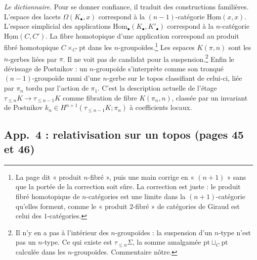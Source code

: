 \documentclass[11pt,a4paper]{article}
\begin{document}
\emph{Le dictionnaire.} Pour se donner confiance, il traduit des
constructions familières. L'espace des lacets $\Omega(K_\bullet,x)$
correspond à la $(n-1)$-catégorie $\underline{\mathrm{Hom}}(x,x)$. L'espace
simplicial des applications $\mathrm{Hom}_\bullet(K_\bullet,K'_\bullet)$
correspond à la $n$-catégorie $\underline{\mathrm{Hom}}(C,C')$. La fibre
homotopique d'une application correspond au produit fibré homotopique
$C \times_{C'} \mathrm{pt}$ dans les $n$-groupoïdes.\footnote{La page dit
« produit $n$-fibré », puis une main corrige en « $(n+1)$ » sans que la
portée de la correction soit sûre. La correction est juste : le produit
fibré homotopique de $n$-catégories est une limite dans la
$(n+1)$-catégorie qu'elles forment, comme le « produit $2$-fibré » de
catégories de Giraud est celui des $1$-catégories.} Les espaces
$K(\pi,n)$ sont les $n$-gerbes liées par $\pi$. Il ne voit pas de candidat
pour la suspension.\footnote{Il n'y en a pas à l'intérieur des
$n$-groupoïdes : la suspension d'un $n$-type n'est pas un $n$-type. Ce qui
existe est $\tau_{\leqslant n}\Sigma$, la somme amalgamée
$\mathrm{pt}\sqcup_C\mathrm{pt}$ calculée dans les $n$-groupoïdes.
Commentaire nôtre.} Enfin le dévissage de Postnikov : un $n$-groupoïde
s'interprète comme son tronqué $(n-1)$-groupoïde muni d'une $n$-gerbe sur
le topos classifiant de celui-ci, liée par $\pi_n$ tordu par l'action de
$\pi_1$. C'est la description actuelle de l'étage
$\tau_{\leqslant n}K \to \tau_{\leqslant n-1}K$ comme fibration de fibre
$K(\pi_n,n)$, classée par un invariant de Postnikov
$k_n \in H^{n+1}(\tau_{\leqslant n-1}K;\pi_n)$ à coefficients locaux.

\subsection*{App.~4 : relativisation sur un topos (pages 45 et 46)}
\end{document}
